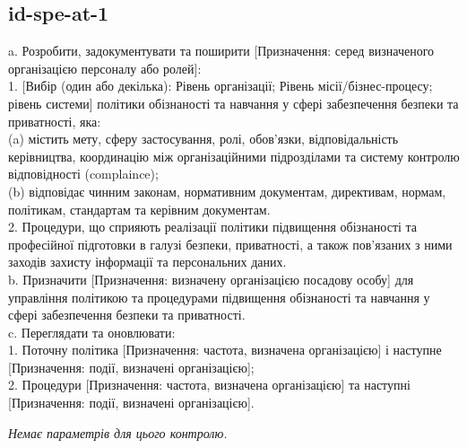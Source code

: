 \documentclass{article}
\begin{document}
\subsection{id-spe-at-1}
a. Розробити, задокументувати та поширити [Призначення: серед визначеного організацією персоналу або ролей]:\\ 
1. [Вибір (один або декілька): Рівень організації; Рівень місії/бізнес-процесу; рівень системи] політики обізнаності та навчання у сфері забезпечення безпеки та приватності, яка:\\ 
(a) містить мету, сферу застосування, ролі, обов'язки, відповідальність керівництва, координацію між організаційними підрозділами та систему контролю відповідності (complaince);\\ 
(b) відповідає чинним законам, нормативним документам, директивам, нормам, політикам, стандартам та керівним документам.\\ 
2. Процедури, що сприяють реалізації політики підвищення обізнаності та професійної підготовки в галузі безпеки, приватності, а також пов'язаних з ними заходів захисту інформації та персональних даних.\\ 
b. Призначити [Призначення: визначену організацією посадову особу] для управління політикою та процедурами підвищення обізнаності та навчання у сфері забезпечення безпеки та приватності.\\ 
c. Переглядати та оновлювати:\\ 
1. Поточну політика [Призначення: частота, визначена організацією] і наступне [Призначення: події, визначені організацією];\\ 
2. Процедури [Призначення: частота, визначена організацією] та наступні [Призначення: події, визначені організацією].

\vspace{10pt}
\textit{Немає параметрів для цього контролю.}
\vspace{10pt}
\end{document}
